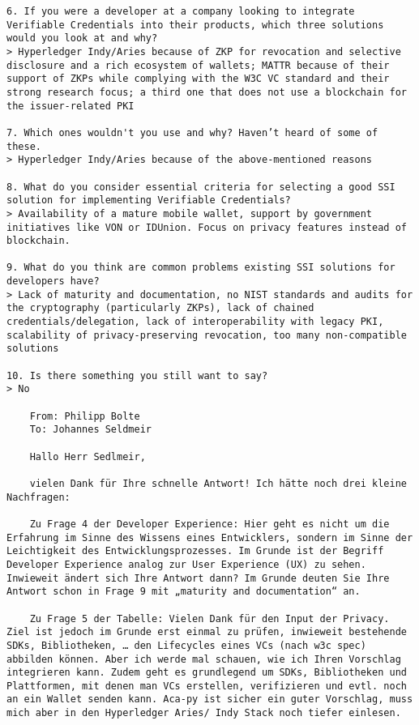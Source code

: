 \begin{Verbatim}[breaklines=true, breaksymbol={}, breaksymbolsepleftnchars=2]
6. If you were a developer at a company looking to integrate Verifiable Credentials into their products, which three solutions would you look at and why? 
> Hyperledger Indy/Aries because of ZKP for revocation and selective disclosure and a rich ecosystem of wallets; MATTR because of their support of ZKPs while complying with the W3C VC standard and their strong research focus; a third one that does not use a blockchain for the issuer-related PKI

7. Which ones wouldn't you use and why? Haven’t heard of some of these. 
> Hyperledger Indy/Aries because of the above-mentioned reasons

8. What do you consider essential criteria for selecting a good SSI solution for implementing Verifiable Credentials? 
> Availability of a mature mobile wallet, support by government initiatives like VON or IDUnion. Focus on privacy features instead of blockchain.

9. What do you think are common problems existing SSI solutions for developers have? 
> Lack of maturity and documentation, no NIST standards and audits for the cryptography (particularly ZKPs), lack of chained credentials/delegation, lack of interoperability with legacy PKI, scalability of privacy-preserving revocation, too many non-compatible solutions

10. Is there something you still want to say? 
> No

    From: Philipp Bolte
    To: Johannes Seldmeir
    
    Hallo Herr Sedlmeir,

    vielen Dank für Ihre schnelle Antwort! Ich hätte noch drei kleine Nachfragen:
    
    Zu Frage 4 der Developer Experience: Hier geht es nicht um die Erfahrung im Sinne des Wissens eines Entwicklers, sondern im Sinne der Leichtigkeit des Entwicklungsprozesses. Im Grunde ist der Begriff Developer Experience analog zur User Experience (UX) zu sehen. Inwieweit ändert sich Ihre Antwort dann? Im Grunde deuten Sie Ihre Antwort schon in Frage 9 mit „maturity and documentation“ an.
    
    Zu Frage 5 der Tabelle: Vielen Dank für den Input der Privacy. Ziel ist jedoch im Grunde erst einmal zu prüfen, inwieweit bestehende SDKs, Bibliotheken, … den Lifecycles eines VCs (nach w3c spec) abbilden können. Aber ich werde mal schauen, wie ich Ihren Vorschlag integrieren kann. Zudem geht es grundlegend um SDKs, Bibliotheken und Plattformen, mit denen man VCs erstellen, verifizieren und evtl. noch an ein Wallet senden kann. Aca-py ist sicher ein guter Vorschlag, muss mich aber in den Hyperledger Aries/ Indy Stack noch tiefer einlesen.
    

\end{Verbatim}
